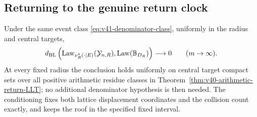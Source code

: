 \subsection{Returning to the genuine return clock}
\begin{theorem}
\label{thm:v41-actual-return-bridge}
Under the same event class \eqref{eq:v41-denominator-class}, uniformly
in the radius and central targets,
\begin{equation}\label{eq:v41-actual-return-bridge}
 d_{\rm BL}\left(\operatorname{Law}_{\nu_R^*(\cdot\mid E)}
                         (\mathcal Y_{n,R}),
                         \operatorname{Law}(\mathbb B_{D_R})\right)
                         \longrightarrow0\qquad(m\to\infty).
\end{equation}
At every fixed radius the conclusion holds uniformly on central target
compact sets over all positive arithmetic residue classes in
Theorem~\ref{thm:v40-arithmetic-return-LLT}; no additional denominator
hypothesis is then needed. The conditioning fixes both lattice
displacement coordinates and the collision count exactly, and keeps
the roof in the specified fixed interval.
\end{theorem}
